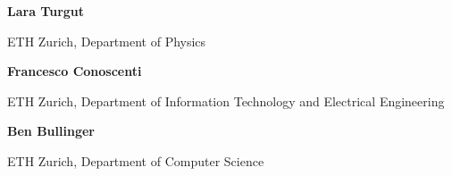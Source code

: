 \documentclass[11pt,aspectratio=169]{beamer}
\begin{document}
\begin{closingframe}

    \begin{center}
        \begin{minipage}{1\textwidth}

            \textbf{Lara Turgut}\hfill\textit{}
            
            \vspace{0.25em}

            ETH Zurich, Department of Physics
            

            \vspace{0.5em}


            \textbf{Francesco Conoscenti}\hfill\textit{}
            
            \vspace{0.25em}

            ETH Zurich, Department of Information Technology and Electrical Engineering
            

            \vspace{0.5em}


            \textbf{Ben Bullinger}\hfill\textit{}

            \vspace{0.25em}

            ETH Zurich, Department of Computer Science

        \end{minipage}
    \end{center}

\end{closingframe}
\end{document}

